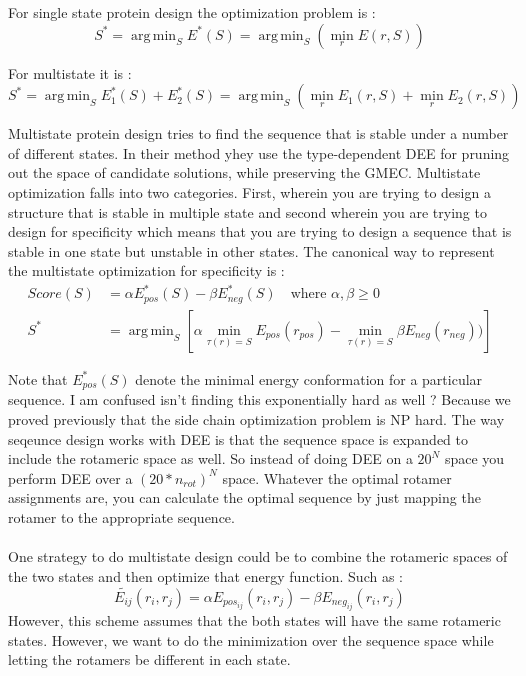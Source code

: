 \documentclass{article}
\DeclareMathOperator*{\argmin}{arg\,min}
\begin{document}
For single state protein design the optimization problem is  : 
\[
S^* = \argmin_S E^*(S) = \argmin_S \left( \min_r E(r,S) \right)
\]

For multistate it is :
\[
S^* = \argmin_S E^*_1(S) + E^*_2(S) = \argmin_S\left( \min_r E_1(r,S) + \min_r E_2(r,S)\right)
\]

Multistate protein design tries to find the sequence that is stable under a number of different states. In their method yhey use the type-dependent DEE for pruning out the space of candidate solutions, while preserving the GMEC. Multistate optimization falls into two categories. First, wherein you are trying to design a structure that is stable in multiple state and second wherein you are trying to design for specificity which means that you are trying to design a sequence that is stable in one state but unstable in other states. The canonical way to represent the multistate optimization for specificity is :
\[
\begin{split}
Score(S) &= \alpha E_{pos}^*(S) - \beta E_{neg}^*(S) \quad \text{where } \alpha,\beta \geq 0 \\
S^* & = \argmin_S \left[\alpha \min_{\tau(r)=S} E_{pos}(r_{pos}) - \min_{\tau(r)=S} \beta E_{neg}(r_{neg})) \right]
\end{split} 
\]

Note that $E_{pos}^*(S)$ denote the minimal energy conformation for a particular sequence. I am confused isn't finding this exponentially hard as well ? Because we proved previously that the side chain optimization problem is NP hard. The way seqeunce design works with DEE is that the sequence space is expanded to include the rotameric space as well. So instead of doing DEE on a $20^N$ space you perform DEE over a $(20*n_{rot})^N$ space. Whatever the optimal rotamer assignments are, you can calculate the optimal sequence by just mapping the rotamer to the appropriate sequence. 
\\
\\
One strategy to do multistate design could be to combine the rotameric spaces of the two states and then optimize that energy function. Such as  : 
\[
\tilde{E_{ij}}(r_i,r_j) = \alpha E_{pos_{ij}}(r_i,r_j) - \beta E_{neg_{ij}}(r_i,r_j)
\]
However, this scheme assumes that the both states will have the same rotameric states. However, we want to do the minimization over the sequence space while letting the rotamers be different in each state. 





\end{document}
